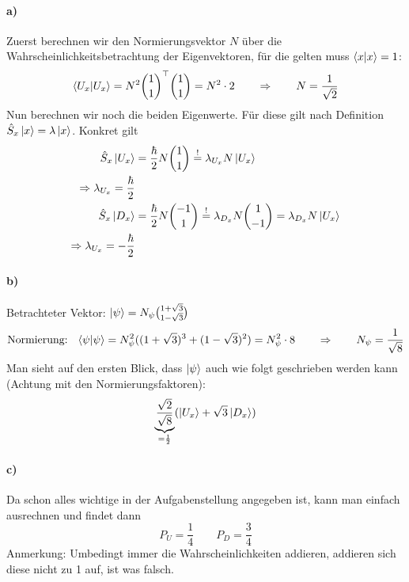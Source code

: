 \documentclass[oneside]{book}
\theoremstyle{definition}
\begin{document}
\paragraph{a)}
Zuerst berechnen wir den Normierungsvektor $N$ über die Wahrscheinlichkeitsbetrachtung der Eigenvektoren, für die gelten muss $\braket{x | x} = 1$:
\begin{align*}
	\braket{U_x | U_x} = N^2 \binom{1}{1}^\top \binom{1}{1} = N^2 \cdot 2 \qquad \Rightarrow \qquad N = \frac{1}{\sqrt{2}}
\end{align*}
Nun berechnen wir noch die beiden Eigenwerte. Für diese gilt nach Definition $\hat{S}_x \ket{x} = \lambda \ket{x}$. Konkret gilt
\begin{align*}
	\hat{S}_x \ket{U_x} &= \frac{\hbar}{2} N \binom{1}{1} \overset{!}{=} \lambda_{U_x} N \ket{U_x}\\
	\Rightarrow \lambda_{U_x} = \frac{\hbar}{2}\\
	\hat{S}_x \ket{D_x} &= \frac{\hbar}{2} N \binom{-1}{1} \overset{!}{=} \lambda_{D_x} N \binom{1}{-1} = \lambda_{D_x} N \ket{U_x}\\
	\Rightarrow \lambda_{U_x} = -\frac{\hbar}{2}
\end{align*}

\paragraph{b)} Betrachteter Vektor: $\ket{\psi} = N_\psi \binom{1 + \sqrt{3}}{1- \sqrt{3}}$
\begin{align*}
	\text{Normierung: ~} \braket{\psi | \psi} = N_\psi^2 ((1 + \sqrt{3})^3 + (1 - \sqrt{3})^2) = N_\psi^2 \cdot 8 \qquad \Rightarrow \qquad N_\psi = \frac{1}{\sqrt{8}}
\end{align*}
Man sieht auf den ersten Blick, dass $\ket{\psi}$ auch wie folgt geschrieben werden kann (Achtung mit den Normierungsfaktoren):
$$\underbrace{\frac{\sqrt{2}}{\sqrt{8}}}_{= \frac{1}{2}} (\ket{U_x} + \sqrt{3} \ket{D_x})$$

\paragraph{c)}
Da schon alles wichtige in der Aufgabenstellung angegeben ist, kann man einfach ausrechnen und findet dann
$$P_U = \frac{1}{4} \qquad P_D = \frac34$$
Anmerkung: Umbedingt immer die Wahrscheinlichkeiten addieren, addieren sich diese nicht zu 1 auf, ist was falsch.
\end{document}
